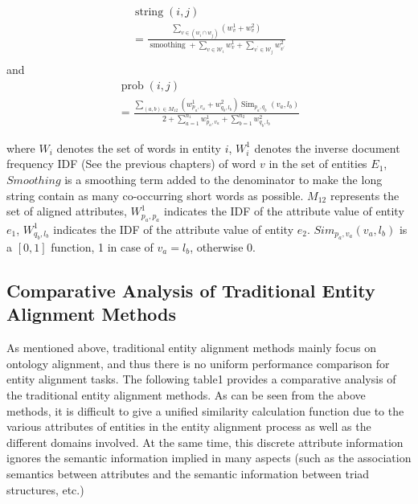 \documentclass[sigconf]{acmart}
\begin{document}
{\begin{equation}
    \begin{array}{l}
    \operatorname{string}(i, j) \\
    =\frac{\sum_{v \in\left(w_{i} \cap w_{j}\right)}\left(w_{v}^{1}+w_{v}^{2}\right)}{\operatorname{smoothing}+\sum_{v \in \mathcal{W}_{i}} w_{v}^{1}+\sum_{v^{\prime} \in \mathcal{W}_{j}} w_{v^{\prime}}^{2}} \\
    \end{array}
\end{equation}
and
\begin{equation}
    \begin{array}{l}
    \operatorname{prob}(i, j) \\
    =\frac{\sum_{(a, b) \in M_{12}}\left(w_{p_{a}, v_{a}}^{1}+w_{q_{b}, l_{b}}^{2}\right) \operatorname{Sim}_{p_{a}, q_{b}}\left(v_{a}, l_{b}\right)}{2+\sum_{a=1}^{n_{1}} w_{p_{a}, v_{a}}^{1}+\sum_{b=1}^{n_{2}} w_{q_{b}, l_{b}}^{2}}
    \end{array}
\end{equation}

where $W_i$ denotes the set of words in entity $i$, $W_i^1$ denotes the inverse document frequency IDF (See the previous chapters) of word $v$ in the set of entities $E_1$, $Smoothing$ is a smoothing term added to the denominator to make the long string contain as many co-occurring short words as possible. $M_{12}$ represents the set of aligned attributes, $W_{p_a,p_a}^1$ indicates the IDF of the attribute value of entity $e_1$, $W_{q_b,l_b}^1$ indicates the IDF of the attribute value of entity $e_2$. $Sim_{p_a,v_a}(v_a,l_b)$ is a $[0,1]$ function, 1 in case of $v_a=l_b$, otherwise 0.




\subsection{Comparative Analysis of Traditional Entity Alignment Methods }

As mentioned above, traditional entity alignment methods mainly focus on ontology alignment, and thus there is no uniform performance comparison for entity alignment tasks. The following table1 provides a comparative analysis of the traditional entity alignment methods. As can be seen from the above methods, it is difficult to give a unified similarity calculation function due to the various attributes of entities in the entity alignment process as well as the different domains involved. At the same time, this discrete attribute information ignores the semantic information implied in many aspects (such as the association semantics between attributes and the semantic information between triad structures, etc.)

}
\end{document}
